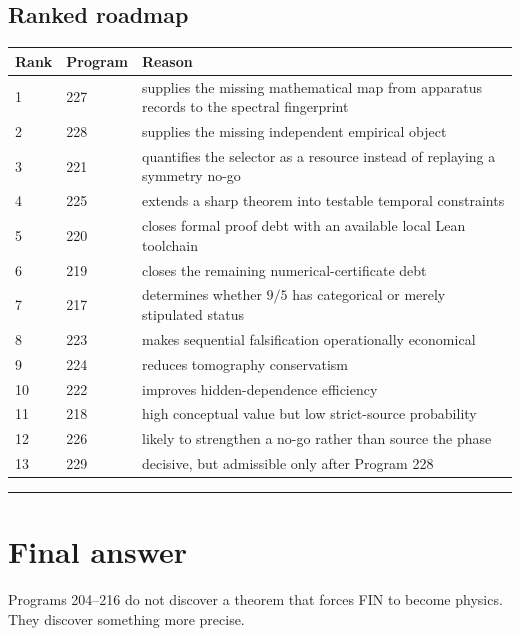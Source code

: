 \documentclass[11pt,a4paper,openany]{report}
\begin{document}
\section{Ranked roadmap}

\begin{center}
\begingroup\small
\setlength{\tabcolsep}{3.5pt}
\renewcommand{\arraystretch}{1.16}
\begin{longtable}{@{}p{}p{}p{}@{}}
\toprule
\textbf{Rank} & \textbf{Program} & \textbf{Reason} \\
\midrule
\endhead
1 & 227 & supplies the missing mathematical map from apparatus records to the spectral fingerprint \\
2 & 228 & supplies the missing independent empirical object \\
3 & 221 & quantifies the selector as a resource instead of replaying a symmetry no-go \\
4 & 225 & extends a sharp theorem into testable temporal constraints \\
5 & 220 & closes formal proof debt with an available local Lean toolchain \\
6 & 219 & closes the remaining numerical-certificate debt \\
7 & 217 & determines whether \(9/5\) has categorical or merely stipulated status \\
8 & 223 & makes sequential falsification operationally economical \\
9 & 224 & reduces tomography conservatism \\
10 & 222 & improves hidden-dependence efficiency \\
11 & 218 & high conceptual value but low strict-source probability \\
12 & 226 & likely to strengthen a no-go rather than source the phase \\
13 & 229 & decisive, but admissible only after Program 228 \\
\bottomrule
\end{longtable}
\endgroup
\end{center}

\par\medskip\hrule\medskip

\chapter{Final answer}

Programs 204--216 do not discover a theorem that forces FIN to become physics. They discover something more precise.
\end{document}
